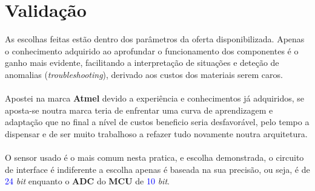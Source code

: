 \section{Validação}
As escolhas feitas estão dentro dos parâmetros da oferta disponibilizada. Apenas o conhecimento adquirido ao aprofundar o funcionamento dos componentes é o ganho mais evidente, facilitando a interpretação de situações e deteção de anomalias (\textit{troubleshooting}), derivado aos custos dos materiais serem caros.\\
\\
Apostei na marca \textbf{Atmel} devido a experiência e conhecimentos já adquiridos, se aposta-se noutra marca teria de enfrentar uma curva de aprendizagem e adaptação que no final a nível de custos beneficio seria desfavorável, pelo tempo a dispensar e de ser muito trabalhoso a refazer tudo novamente noutra arquitetura.\\
\\
O sensor usado é o mais comum nesta pratica, e escolha demonstrada, o circuito de interface é indiferente a escolha apenas é baseada na sua precisão, ou seja, é de \textcolor{blue}{24} \textit{bit} enquanto o \textbf{ADC} do \textbf{MCU} de \textcolor{blue}{10} \textit{bit}.
\\
\\
\\
